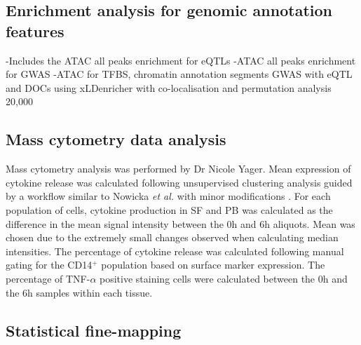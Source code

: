  \subsection{Enrichment analysis for genomic annotation features}
-Includes the ATAC all peaks enrichment for eQTLs 
-ATAC all peaks enrichment for GWAS
-ATAC for TFBS, chromatin annotation segments
GWAS with eQTL and DOCs using xLDenricher with co-localisation and permutation analysis 20,000


\subsection{Mass cytometry data analysis}
Mass cytometry analysis was performed by Dr Nicole Yager. Mean expression of cytokine release was calculated following unsupervised clustering analysis guided by a workflow similar to Nowicka \textit{et al.} with minor modifications \parencite{Nowicka 2017}. For each population of cells, cytokine production in SF and PB was calculated as the difference in the mean signal intensity between the 0h and 6h aliquots. Mean was chosen due to the extremely small changes observed when calculating median intensities. The percentage of cytokine release was calculated following manual gating for the CD14$^+$ population based on surface marker expression.  The percentage of TNF-$\alpha$ positive staining cells were calculated between the 0h and the 6h samples within each tissue.


\subsection{Statistical fine-mapping}

